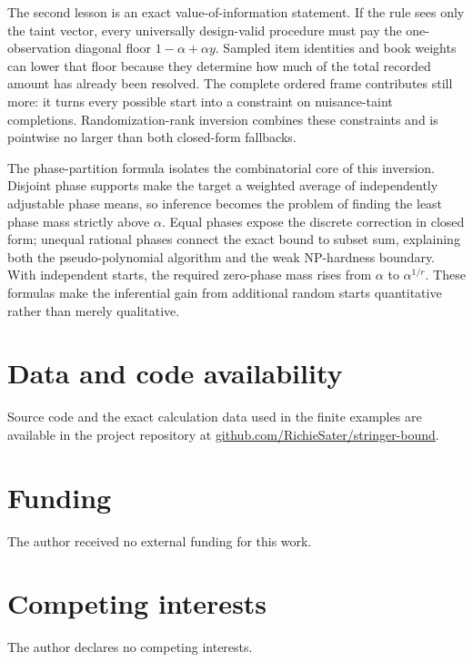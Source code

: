 \documentclass[11pt]{article}
\theoremstyle{definition}
\begin{document}
The second lesson is an exact value-of-information statement.  If the rule
sees only the taint vector, every universally design-valid procedure must pay
the one-observation diagonal floor $1-\alpha+\alpha y$.  Sampled item
identities and book weights can lower that floor because they determine how
much of the total recorded amount has already been resolved.  The complete
ordered frame contributes still more: it turns every possible start into a
constraint on nuisance-taint completions.  Randomization-rank inversion
combines these constraints and is pointwise no larger than both closed-form
fallbacks.

The phase-partition formula isolates the combinatorial core of this
inversion.  Disjoint phase supports make the target a weighted average of
independently adjustable phase means, so inference becomes the problem of
finding the least phase mass strictly above $\alpha$.  Equal phases expose
the discrete correction in closed form; unequal rational phases connect the
exact bound to subset sum, explaining both the pseudo-polynomial algorithm
and the weak NP-hardness boundary.  With independent starts, the required
zero-phase mass rises from $\alpha$ to $\alpha^{1/r}$.  These formulas make
the inferential gain from additional random starts quantitative rather than
merely qualitative.

\section*{Data and code availability}

Source code and the exact calculation data used in the finite examples are
available in the project repository at
\href{https://github.com/RichieSater/stringer-bound}
{github.com/RichieSater/stringer-bound}.

\section*{Funding}

The author received no external funding for this work.

\section*{Competing interests}

The author declares no competing interests.
\end{document}
